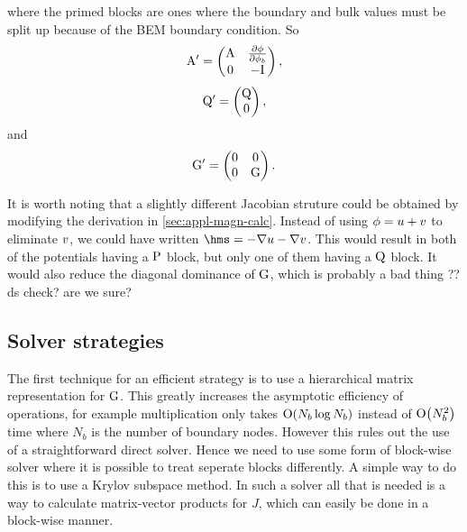 where the primed blocks are ones where the boundary and bulk values must be split up because of the BEM boundary condition.
So
\begin{equation}
  \mathrm{A}' =
  \begin{pmatrix}
    \mathrm{A}     & \frac{\partial \phi}{\partial \phi_b} \\
    0      & -\mathrm{I}  
  \end{pmatrix},
\end{equation}
\begin{equation}
  \mathrm{Q}' =
  \begin{pmatrix}
    \mathrm{Q} \\
    0    
  \end{pmatrix},
\end{equation}
and
\begin{equation}
  {\mathbf{\mathrm{G}}}' =
  \begin{pmatrix}
    0  & 0 \\
    0  & {\mathbf{\mathrm{G}}} 
  \end{pmatrix}.
\end{equation}


It is worth noting that a slightly different Jacobian struture could be obtained by modifying the derivation in \cref{sec:appl-magn-calc}.
Instead of using $\phi = u + v$ to eliminate $v$, we could have written $\hms = - \grad \phione - \grad \phitwo$.
This would result in both of the potentials having a $\mathrm{P}$ block, but only one of them having a $\mathrm{Q}$ block.
It would also reduce the diagonal dominance of ${\mathbf{\mathrm{G}}}$, which is probably a bad thing ??ds check? are we sure?


\subsection{Solver strategies}
\label{sec:bem-solver-strategies}

The first technique for an efficient strategy is to use a hierarchical matrix representation for ${\mathbf{\mathrm{G}}}$.
This greatly increases the asymptotic efficiency of operations, for example multiplication only takes $\mathrm{O}{\left( N_b \log N_b \right)}$ instead of $\mathrm{O}{\left( N_b^2 \right)}$ time where $N_b$ is the number of boundary nodes.
However this rules out the use of a straightforward direct solver.
Hence we need to use some form of block-wise solver where it is possible to treat seperate blocks differently.
A simple way to do this is to use a Krylov subspace method.
In such a solver all that is needed is a way to calculate matrix-vector products for $J$, which can easily be done in a block-wise manner.

